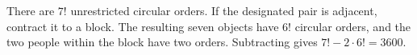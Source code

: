 There are $7!$ unrestricted circular orders. If the designated pair is adjacent, contract it to a block. The resulting seven objects have $6!$ circular orders, and the two people within the block have two orders. Subtracting gives $7!-2\cdot6!=\boxed{3600}$.
